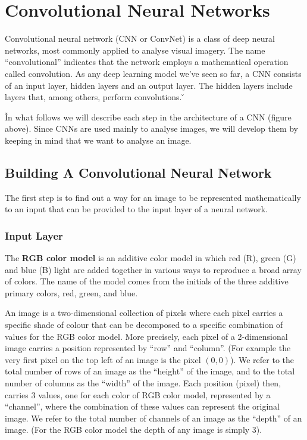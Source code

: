 \section{Convolutional Neural Networks}

Convolutional neural network (CNN or ConvNet) is a class of deep neural networks, most commonly applied to analyse 
visual imagery. The name ``convolutional'' indicates that the network employs a mathematical operation called 
convolution. As any deep learning model we've seen so far, a CNN consists of an input layer, hidden layers and an 
output layer. The hidden layers include layers that, among others, perform convolutions. \v


\v

In what follows we will describe each step in the architecture of a CNN (figure above). Since CNNs are used mainly to
analyse images, we will develop them by keeping in mind that we want to analyse an image.

\subsection{Building A Convolutional Neural Network}

The first step is to find out a way for an image to be represented mathematically to an input that can be provided to
the input layer of a neural network.

\subsubsection*{Input Layer}

The \textbf{RGB color model} is an additive color model in which red (R), green (G) and blue (B) light are added 
together in various ways to reproduce a broad array of colors. The name of the model comes from the initials of the 
three additive primary colors, red, green, and blue. 
\ed

An image is a two-dimensional collection of pixels where each pixel carries a specific shade of colour that can be
decomposed to a specific combination of values for the RGB color model. More precisely, each pixel of a 2-dimensional
image carries a position represented by ``row'' and ``column''. (For example the very first pixel on the top left of
an image is the pixel $(0,0)$). We refer to the total number of rows of an image as the ``height'' of the image, and
to the total number of columns as the ``width'' of the image. Each position (pixel) then, carries 3 values, one for
each color of RGB color model, represented by a ``channel'', where the combination of these values can represent the
original image. We refer to the total number of channels of an image as the ``depth'' of an image. (For the RGB color
model the depth of any image is simply 3).

